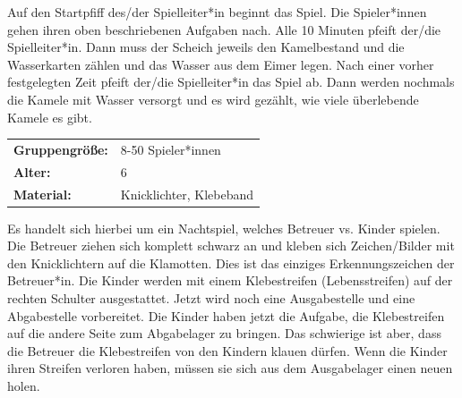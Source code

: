 Auf den Startpfiff des/der Spielleiter*in beginnt das Spiel. Die Spieler*innen gehen ihren oben beschriebenen Aufgaben nach. Alle 10 Minuten pfeift der/die Spielleiter*in. Dann muss der Scheich jeweils den Kamelbestand und die Wasserkarten zählen und das Wasser aus dem Eimer legen. Nach einer vorher festgelegten Zeit pfeift der/die Spielleiter*in das Spiel ab. Dann werden nochmals die Kamele mit Wasser versorgt und es wird gezählt, wie viele überlebende Kamele es gibt.


\begin{table}[H]
\begin{tabular}{>{\bfseries}lp{8cm}}
   Gruppengröße:   & 8-50 Spieler*innen\\
    Alter: & 6 \\
    Material: & Knicklichter, Klebeband \\ 
\end{tabular}
\end{table} 
Es handelt sich hierbei um ein Nachtspiel, welches Betreuer vs. Kinder spielen. Die Betreuer ziehen sich komplett schwarz an und kleben sich Zeichen/Bilder mit den Knicklichtern auf die Klamotten. Dies ist das einziges 
Erkennungszeichen der Betreuer*in. Die Kinder werden mit einem Klebestreifen (Lebensstreifen) auf der rechten Schulter ausgestattet. Jetzt wird noch eine Ausgabestelle und eine Abgabestelle vorbereitet. Die Kinder haben jetzt die Aufgabe, die Klebestreifen auf die andere Seite zum Abgabelager zu bringen. Das schwierige ist aber, dass die Betreuer die Klebestreifen von den Kindern klauen dürfen. Wenn die Kinder ihren Streifen verloren haben, müssen sie sich aus dem Ausgabelager einen neuen holen.


